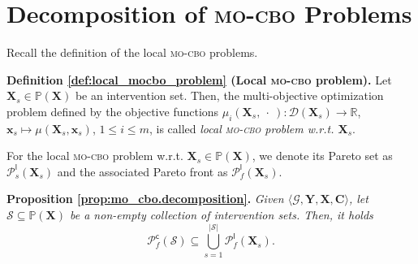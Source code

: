 \section{Decomposition of \textsc{mo-cbo} Problems}\label{appendix:mo_cbo_decomposition}

Recall the definition of the local \textsc{mo-cbo} problems.

\textbf{Definition \ref{def:local_mocbo_problem} \textnormal{(Local \textsc{mo-cbo} problem)}.}
Let $\textbf{X}_s \in \mathbb{P}(\mathbf{X})$ be an intervention set. Then, the multi-objective optimization problem defined by the objective functions $\mu_i(\mathbf{X}_s,\ \cdot \ ): \mathcal{D}(\mathbf{X}_s) \rightarrow \mathbb{R}$, $\mathbf{x}_s \mapsto \mu(\mathbf{X}_s,\mathbf{x}_s)$, $1 \leq i \leq m$, is called \textit{local \textsc{mo-cbo} problem w.r.t. $\mathbf{X}_s$}.

For the local \textsc{mo-cbo} problem w.r.t. $\mathbf{X}_s \in \mathbb{P}(\mathbf{X})$, we denote its Pareto set as $\mathcal{P}_s^{\textsf{l}}(\mathbf{X}_s)$ and the associated Pareto front as $\mathcal{P}_f^{\textsf{l}}(\mathbf{X}_s)$. 

\textbf{Proposition \ref{prop:mo_cbo.decomposition}.} \textit{Given $\langle \mathcal{G}, \mathbf{Y},\mathbf{X}, \mathbf{C} \rangle$, let $\mathcal{S} \subseteq \mathbb{P}(\mathbf{X})$ be a non-empty collection of intervention sets. Then, it holds}
\begin{equation}
    \mathcal{P}_f^{\textsf{c}}(\mathcal{S}) \subseteq \bigcup_{s=1}^{|\mathcal{S}|} \mathcal{P}_f^{\textsf{l}}(\mathbf{X}_s).
\end{equation}


